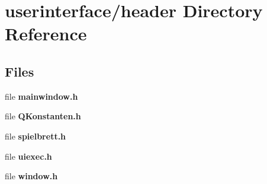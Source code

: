 \section{userinterface/header Directory Reference}
\label{dir_615fd9a8fa5a49e03f142f62147f21b6}
\subsection*{Files}
\begin{DoxyCompactItemize}
\item 
file {\bfseries mainwindow.\-h}
\item 
file {\bfseries Q\-Konstanten.\-h}
\item 
file {\bfseries spielbrett.\-h}
\item 
file {\bfseries uiexec.\-h}
\item 
file {\bfseries window.\-h}
\end{DoxyCompactItemize}

